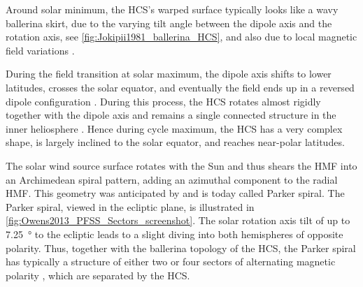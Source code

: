 Around solar minimum, the HCS's warped surface typically looks like a wavy ballerina skirt, due to the varying tilt angle between the dipole axis and the rotation axis, see \autoref{fig:Jokipii1981_ballerina_HCS}, and also due to local magnetic field variations \citep{Jokipii1981}.

During the field transition at solar maximum, the dipole axis shifts to lower latitudes, crosses the solar equator, and eventually the field ends up in a reversed dipole configuration \citep{Jones2003}. During this process, the HCS rotates almost rigidly together with the dipole axis and remains a single connected structure in the inner heliosphere \citep{Jones2003}. Hence during cycle maximum, the HCS has a very complex shape, is largely inclined to the solar equator, and reaches near-polar latitudes.

The solar wind source surface rotates with the Sun and thus shears the HMF into an Archimedean spiral pattern, adding an azimuthal component to the radial HMF. This geometry was anticipated by \citet{Parker1958} and is today called Parker spiral. The Parker spiral, viewed in the ecliptic plane, is illustrated in \autoref{fig:Owens2013_PFSS_Sectors_screenshot}. The solar rotation axis tilt of up to \SI{7.25}{\degree} to the ecliptic leads to a slight diving into both hemispheres of opposite polarity. Thus, together with the ballerina topology of the HCS, the Parker spiral has typically a structure of either two or four sectors of alternating magnetic polarity \citep{Ness1965}, which are separated by the HCS.
\begin{figure}[htb]
\end{figure}


